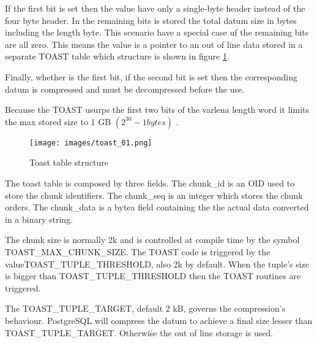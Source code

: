 If the first bit is set then the value have only a single-byte header instead of the four byte header.
In the remaining bits is stored the total datum size in bytes including the length byte. This scenario
have a special case uf the remaining bits are all zero. This means the value is a pointer to an out of line
data stored in a separate TOAST table which structure is shown in figure \ref{fig:TOAST01}.\newline

Finally, whether is the first bit,  if the second bit is set then the corresponding datum is compressed and
must be decompressed before the use.\newline

Because the TOAST usurps the first two bits of the varlena length word it limits the max stored size to 1
GB  \begin{math} (2^{30} -1 bytes) \end{math} .

\begin{figure}[H]
\begin{center}

\texttt{[image: images/toast\_01.png]}

\caption{Toast table structure}
\label{fig:TOAST01}
\end{center}

\end{figure}

The toast table is composed by three fields. The chunk\_id is an OID used to store the chunk identifiers.
The chunk\_seq is an integer which stores the chunk orders. The chunk\_data is a bytea field containing the
the actual data converted in a binary string.\newline

The chunk size is normally 2k and is controlled at compile time by the symbol\newline
TOAST\_MAX\_CHUNK\_SIZE. The TOAST code is triggered by the value\newline  TOAST\_TUPLE\_THRESHOLD, also 2k
by default. When the tuple's size is
bigger than \newline TOAST\_TUPLE\_THRESHOLD then the TOAST routines are triggered.\newline

The TOAST\_TUPLE\_TARGET, default 2 kB, governs the compression's behaviour. PostgreSQL will compress the
datum to achieve a final size lesser than \newline TOAST\_TUPLE\_TARGET. Otherwise the out of line storage
is used.

